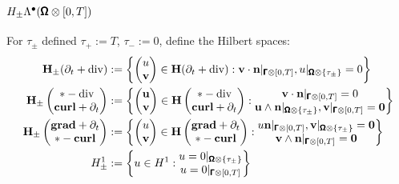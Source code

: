         \subsection*{$H_{\pm}\Lambda^{\bullet}(\pmb{\mathsf{\Omega}}\otimes[0, T])$}
            For $\tau_{\pm}$ defined $\tau_{+}  :=  T$, $\tau_{-}  :=  0$, define the Hilbert spaces:
            \begin{align}
                \mathbf{H}_{\pm}(\partial_{t} + \mathrm{div})  &:=  \left\{\begin{pmatrix} u \\ \mathbf{v} \end{pmatrix} \in \mathbf{H}(\partial_{t} + \mathrm{div}) : \mathbf{v}\cdot\mathbf{n}|_{\pmb{\mathsf{\Gamma}}\otimes[0, T]}, u|_{\pmb{\mathsf{\Omega}}\otimes\{\tau_{\pm}\}} = 0\right\}  \\
                \mathbf{H}_{\pm}\left(\begin{matrix} * - \mathrm{div} \\ \mathbf{curl} + \partial_{t} \end{matrix}\right)  &:=  \left\{\begin{pmatrix} \mathbf{u} \\ \mathbf{v} \end{pmatrix} \in \mathbf{H}\left(\begin{matrix} * - \mathrm{div} \\ \mathbf{curl} + \partial_{t} \end{matrix}\right) : \begin{matrix} \mathbf{v}\cdot\mathbf{n}|_{\pmb{\mathsf{\Gamma}}\otimes[0, T]} = 0 \\ \mathbf{u}\wedge\mathbf{n}|_{\pmb{\mathsf{\Omega}}\otimes\{\tau_{\pm}\}}, \mathbf{v}|_{\pmb{\mathsf{\Gamma}}\otimes[0, T]} = \mathbf{0} \end{matrix}\right\}  \\
                \mathbf{H}_{\pm}\left(\begin{matrix} \mathbf{grad} + \partial_{t} \\ * - \mathbf{curl} \end{matrix}\right)  &:=  \left\{\begin{pmatrix} u \\ \mathbf{v} \end{pmatrix} \in \mathbf{H}\left(\begin{matrix} \mathbf{grad} + \partial_{t} \\ * - \mathbf{curl} \end{matrix}\right) : \begin{matrix} u\mathbf{n}|_{\pmb{\mathsf{\Gamma}}\otimes[0, T]}, \mathbf{v}|_{\pmb{\mathsf{\Omega}}\otimes\{\tau_{\pm}\}} = \mathbf{0} \\ \mathbf{v}\wedge\mathbf{n}|_{\pmb{\mathsf{\Gamma}}\otimes[0, T]} = \mathbf{0} \end{matrix}\right\}  \\
                H^{1}_{\pm}  &:=  \left\{u \in H^{1} : \begin{matrix} u = 0|_{\pmb{\mathsf{\Omega}}\otimes\{\tau_{\pm}\}} \\ u = 0|_{\pmb{\mathsf{\Gamma}}\otimes[0, T]} \end{matrix}\right\}
            \end{align}
